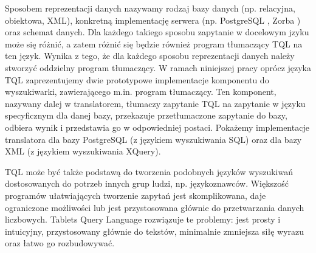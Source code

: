 Sposobem reprezentacji danych nazywamy rodzaj bazy danych (np. relacyjna, obiektowa, XML), konkretną implementację serwera 
(np. PostgreSQL \cite{postgres}, Zorba \cite{zorba}) oraz schemat danych. Dla każdego takiego sposobu zapytanie w docelowym jzyku może się różnić, a zatem 
różnić się będzie również program tłumaczący TQL na ten język.
Wynika z tego, że dla każdego sposobu reprezentacji danych należy stworzyć oddzielny program tłumaczący. 
W ramach niniejszej pracy oprócz języka TQL zaprezentujemy dwie prototypowe implementacje komponentu do wyszukiwarki, zawierającego 
m.in. program tłumaczący.
Ten komponent, nazywany dalej w translatorem, tłumaczy zapytanie TQL na zapytanie w języku specyficznym dla danej bazy, przekazuje 
przetłumaczone zapytanie do bazy, odbiera wynik i przedstawia go w odpowiedniej postaci. Pokażemy implementacje translatora dla bazy 
PostgreSQL (z językiem wyszukiwania SQL) oraz dla bazy XML (z językiem wyszukiwania XQuery).





TQL może być także podstawą do tworzenia podobnych języków wyszukiwań dostosowanych do potrzeb innych grup ludzi, np. językoznawców.
Większość programów ułatwiających tworzenie zapytań jest skomplikowana, daje ograniczone możliwości lub jest przystosowana głównie do 
przetwarzania danych liczbowych. Tablets Query Language rozwiązuje te problemy: jest prosty i intuicyjny, przystosowany głównie do tekstów,
 minimalnie zmniejsza siłę wyrazu oraz łatwo go rozbudowywać. 




